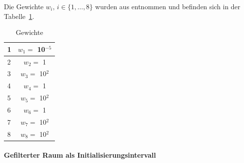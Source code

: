 \documentclass[fontsize=12, a4aper]{scrartcl}
\begin{document}
	Die Gewichte \(w_i, \, i \in \{1, \dots, 8\}\) wurden aus \cite{ACO_2013} entnommen und befinden sich in der Tabelle~\ref{table:CSD_penalty_weights}.
	
	\begin{table}[H]
		
		\fontsize{12pt}{12pt}
		
		\caption{Gewichte}
		
		\label{table:CSD_penalty_weights}
		
		\begin{center}
			
			\def\arraystretch{1.5}
			
			\begin{tabular}{| l | c |}
				
				\hline
				
				1 & \(w_1 = \) 10\(^{-5}\)\\
				
				\hline
				
				2 & \(w_2 =\) 1\\
				
				\hline
				
				3 & \(w_3 =\) 10\(^2\)\\
				
				\hline
				
				4 & \(w_4 =\) 1\\
				
				\hline
				
				5 & \(w_5 =\) 10\(^2\)\\
				
				\hline
				
				6 & \(w_6 =\) 1\\
				
				\hline
				
				7 & \(w_7 =\) 10\(^2\)\\
				
				\hline
				
				8 & \(w_8 =\) 10\(^2\)\\
				
				\hline
				
			\end{tabular}
			
		\end{center}
		
	\end{table}
	
	\paragraph{Gefilterter Raum als Initialisierungsintervall}\mbox{}\\
	\newline
	
\end{document}
